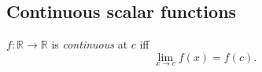 



\subsection{Continuous scalar functions}
\label{sec:cont-scal-funct}

\begin{defn}
  \label{def:continuousScalarFunc}
  $f: \mathbb{R}\rightarrow \mathbb{R}$
  is \emph{continuous} at $c$
  iff
   \begin{equation}
     \label{eq:continuous}
     \lim_{x\rightarrow c} f(x) = f(c).
   \end{equation}
\end{defn}

